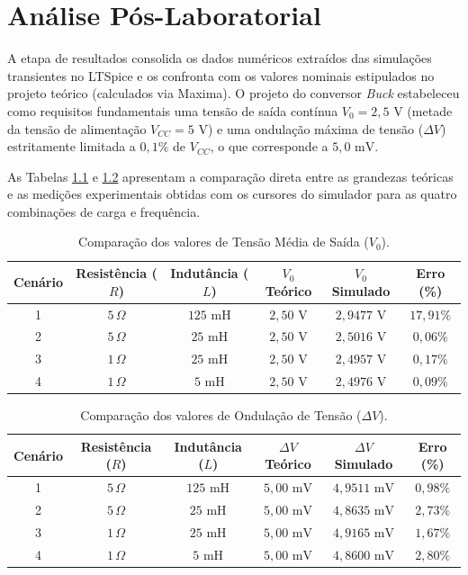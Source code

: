 \chapter{Análise Pós-Laboratorial}

A etapa de resultados consolida os dados numéricos extraídos das simulações transientes no LTSpice e os confronta com os valores nominais estipulados no projeto teórico (calculados via Maxima). O projeto do conversor \textit{Buck} estabeleceu como requisitos fundamentais uma tensão de saída contínua $V_0 = 2,5\text{ V}$ (metade da tensão de alimentação $V_{CC} = 5\text{ V}$) e uma ondulação máxima de tensão ($\Delta V$) estritamente limitada a $0,1\%$ de $V_{CC}$, o que corresponde a $5,0\text{ mV}$.

As Tabelas \ref{tab:resultados_v0} e \ref{tab:resultados_deltav} apresentam a comparação direta entre as grandezas teóricas e as medições experimentais obtidas com os cursores do simulador para as quatro combinações de carga e frequência.

\begin{table}[H]
	\centering
	\caption{Comparação dos valores de Tensão Média de Saída ($V_0$).}
	\label{tab:resultados_v0}
	\renewcommand{\arraystretch}{1.3}
	\begin{tabular}{cccccc}
		\hline
		\textbf{Cenário} & \textbf{Resistência ($R$)} & \textbf{Indutância ($L$)} & \textbf{$V_0$ Teórico} & \textbf{$V_0$ Simulado} & \textbf{Erro (\%)} \\ \hline
		1 & $5\,\Omega$ & $125\text{ mH}$ & $2,50\text{ V}$ & $2,9477\text{ V}$ & $17,91\%$ \\
		2 & $5\,\Omega$ & $25\text{ mH}$ & $2,50\text{ V}$ & $2,5016\text{ V}$ & $0,06\%$ \\
		3 & $1\,\Omega$ & $25\text{ mH}$ & $2,50\text{ V}$ & $2,4957\text{ V}$ & $0,17\%$ \\
		4 & $1\,\Omega$ & $5\text{ mH}$ & $2,50\text{ V}$ & $2,4976\text{ V}$ & $0,09\%$ \\ \hline
	\end{tabular}
\end{table}

\begin{table}[H]
	\centering
	\caption{Comparação dos valores de Ondulação de Tensão ($\Delta V$).}
	\label{tab:resultados_deltav}
	\renewcommand{\arraystretch}{1.3}
	\begin{tabular}{cccccc}
		\hline
		\textbf{Cenário} & \textbf{Resistência ($R$)} & \textbf{Indutância ($L$)} & \textbf{$\Delta V$ Teórico} & \textbf{$\Delta V$ Simulado} & \textbf{Erro (\%)} \\ \hline
		1 & $5\,\Omega$ & $125\text{ mH}$ & $5,00\text{ mV}$ & $4,9511\text{ mV}$ & $0,98\%$ \\
		2 & $5\,\Omega$ & $25\text{ mH}$ & $5,00\text{ mV}$ & $4,8635\text{ mV}$ & $2,73\%$ \\
		3 & $1\,\Omega$ & $25\text{ mH}$ & $5,00\text{ mV}$ & $4,9165\text{ mV}$ & $1,67\%$ \\
		4 & $1\,\Omega$ & $5\text{ mH}$ & $5,00\text{ mV}$ & $4,8600\text{ mV}$ & $2,80\%$ \\ \hline
	\end{tabular}
\end{table}
